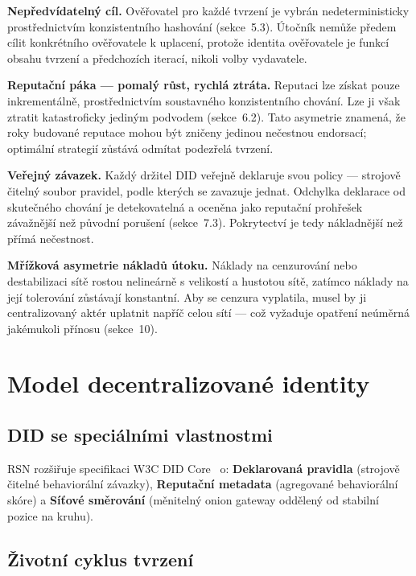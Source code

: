 \documentclass[11pt,a4paper,twocolumn]{article}
\begin{document}
\textbf{Nepředvídatelný cíl.} Ověřovatel pro každé tvrzení je vybrán nedeterministicky prostřednictvím konzistentního hashování (sekce~5.3). Útočník nemůže předem cílit konkrétního ověřovatele k uplacení, protože identita ověřovatele je funkcí obsahu tvrzení a předchozích iterací, nikoli volby vydavatele.

\textbf{Reputační páka --- pomalý růst, rychlá ztráta.} Reputaci lze získat pouze inkrementálně, prostřednictvím soustavného konzistentního chování. Lze ji však ztratit katastroficky jediným podvodem (sekce~6.2). Tato asymetrie znamená, že roky budované reputace mohou být zničeny jedinou nečestnou endorsací; optimální strategií zůstává odmítat podezřelá tvrzení.

\textbf{Veřejný závazek.} Každý držitel DID veřejně deklaruje svou policy --- strojově čitelný soubor pravidel, podle kterých se zavazuje jednat. Odchylka deklarace od skutečného chování je detekovatelná a oceněna jako reputační prohřešek závažnější než původní porušení (sekce~7.3). Pokrytectví je tedy nákladnější než přímá nečestnost.

\textbf{Mřížková asymetrie nákladů útoku.} Náklady na cenzurování nebo destabilizaci sítě rostou nelineárně s velikostí a hustotou sítě, zatímco náklady na její tolerování zůstávají konstantní. Aby se cenzura vyplatila, musel by ji centralizovaný aktér uplatnit napříč celou sítí --- což vyžaduje opatření neúměrná jakémukoli přínosu (sekce~10).

\section{Model decentralizované identity}

\subsection{DID se speciálními vlastnostmi}

RSN rozšiřuje specifikaci W3C DID Core~\cite{did2022} o: \textbf{Deklarovaná pravidla} (strojově čitelné behaviorální závazky), \textbf{Reputační metadata} (agregované behaviorální skóre) a \textbf{Síťové směrování} (měnitelný onion gateway oddělený od stabilní pozice na kruhu).

\subsection{Životní cyklus tvrzení}
\end{document}
